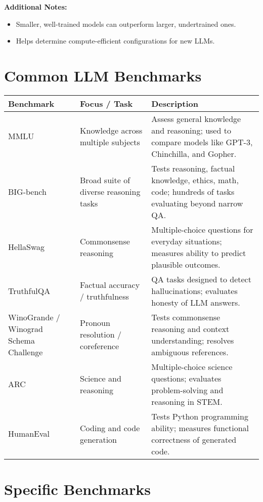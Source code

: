 \textbf{Additional Notes:}
\begin{itemize}
    \item Smaller, well-trained models can outperform larger, undertrained ones.
    \item Helps determine compute-efficient configurations for new LLMs.
\end{itemize}

\vspace{1em}

\section{Common LLM Benchmarks}
\begin{tabularx}{\textwidth}{|>{\hsize=0.2\hsize}X|>{\hsize=0.3\hsize}X|>{\hsize=0.5\hsize}X|}
\hline
\textbf{Benchmark} & \textbf{Focus / Task} & \textbf{Description} \\
\hline
MMLU & Knowledge across multiple subjects & Assess general knowledge and reasoning; used to compare models like GPT-3, Chinchilla, and Gopher. \\
\hline
BIG-bench & Broad suite of diverse reasoning tasks & Tests reasoning, factual knowledge, ethics, math, code; hundreds of tasks evaluating beyond narrow QA. \\
\hline
HellaSwag & Commonsense reasoning & Multiple-choice questions for everyday situations; measures ability to predict plausible outcomes. \\
\hline
TruthfulQA & Factual accuracy / truthfulness & QA tasks designed to detect hallucinations; evaluates honesty of LLM answers. \\
\hline
WinoGrande / Winograd Schema Challenge & Pronoun resolution / coreference & Tests commonsense reasoning and context understanding; resolves ambiguous references. \\
\hline
ARC & Science and reasoning & Multiple-choice science questions; evaluates problem-solving and reasoning in STEM. \\
\hline
HumanEval & Coding and code generation & Tests Python programming ability; measures functional correctness of generated code. \\
\hline
\end{tabularx}

\vspace{1em}

\section{Specific Benchmarks}

